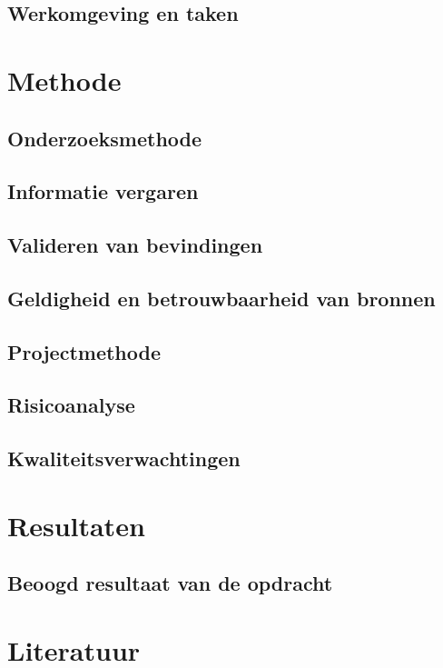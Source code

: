 \documentclass{report}
\begin{document}
\section{Werkomgeving en taken}


\chapter{Methode}

\section{Onderzoeksmethode}

\section{Informatie vergaren}

\section{Valideren van bevindingen}

\section{Geldigheid en betrouwbaarheid van bronnen}

\section{Projectmethode}

\section{Risicoanalyse}

\section{Kwaliteitsverwachtingen}


\chapter{Resultaten}

\section{Beoogd resultaat van de opdracht}


\chapter{Literatuur}
\end{document}

